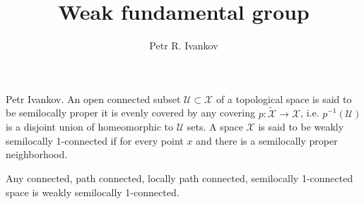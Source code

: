 \documentclass{beamer}
\title{Weak fundamental group}
\institute
{
Algebras in analysis
}
\author{Petr R. Ivankov  }
\theoremstyle{plain}
\newcommand{\sU}{\mathcal{U}}       %
\newcommand{\sX}{\mathcal{X}}       %
\begin{document}
\begin{frame}
  \titlepage
\end{frame}
\begin{frame}
\begin{definition}\label{top_weakly_semi1_defn}\alert{Petr Ivankov.}
		An open connected subset $\sU\subset \sX$ of a topological space is said to be \alert{semilocally proper} it is evenly covered by any covering $p:\widetilde{\sX}\to\sX$, i.e. $p^{-1}\left(\sU \right)$ is a disjoint union of homeomorphic to $\sU$ sets. 
A space $\sX$ is said to be \alert{weakly semilocally 1-connected} if for  every point $x$ and there is a semilocally proper neighborhood.
\end{definition} 
\begin{example}
	Any connected, path connected, locally path connected, semilocally 1-connected   space is weakly semilocally 1-connected.
\end{example}

\end{frame}
\end{document}
